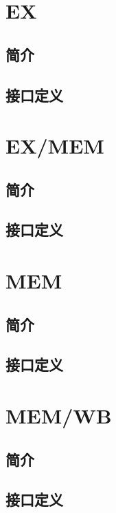\documentclass{article}
\begin{document}
\section{EX}
\label{sec:EX}

\subsection{简介}

\subsection{接口定义}

\section{EX/MEM}
\label{sec:EX/MEM}

\subsection{简介}

\subsection{接口定义}

\section{MEM}
\label{sec:MEM}

\subsection{简介}

\subsection{接口定义}

\section{MEM/WB}
\label{sec:MEM/WB}

\subsection{简介}

\subsection{接口定义}
\end{document}
